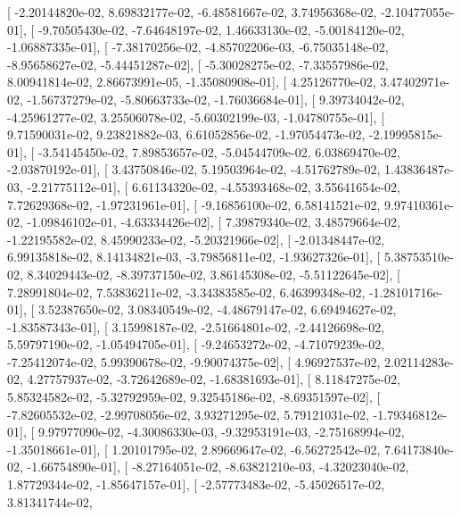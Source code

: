 \documentclass{article}
\begin{document}
       [ -2.20144820e-02,   8.69832177e-02,  -6.48581667e-02,
          3.74956368e-02,  -2.10477055e-01],
       [ -9.70505430e-02,  -7.64648197e-02,   1.46633130e-02,
         -5.00184120e-02,  -1.06887335e-01],
       [ -7.38170256e-02,  -4.85702206e-03,  -6.75035148e-02,
         -8.95658627e-02,  -5.44451287e-02],
       [ -5.30028275e-02,  -7.33557986e-02,   8.00941814e-02,
          2.86673991e-05,  -1.35080908e-01],
       [  4.25126770e-02,   3.47402971e-02,  -1.56737279e-02,
         -5.80663733e-02,  -1.76036684e-01],
       [  9.39734042e-02,  -4.25961277e-02,   3.25506078e-02,
         -5.60302199e-03,  -1.04780755e-01],
       [  9.71590031e-02,   9.23821882e-03,   6.61052856e-02,
         -1.97054473e-02,  -2.19995815e-01],
       [ -3.54145450e-02,   7.89853657e-02,  -5.04544709e-02,
          6.03869470e-02,  -2.03870192e-01],
       [  3.43750846e-02,   5.19503964e-02,  -4.51762789e-02,
          1.43836487e-03,  -2.21775112e-01],
       [  6.61134320e-02,  -4.55393468e-02,   3.55641654e-02,
          7.72629368e-02,  -1.97231961e-01],
       [ -9.16856100e-02,   6.58141521e-02,   9.97410361e-02,
         -1.09846102e-01,  -4.63334426e-02],
       [  7.39879340e-02,   3.48579664e-02,  -1.22195582e-02,
          8.45990233e-02,  -5.20321966e-02],
       [ -2.01348447e-02,   6.99135818e-02,   8.14134821e-03,
         -3.79856811e-02,  -1.93627326e-01],
       [  5.38753510e-02,   8.34029443e-02,  -8.39737150e-02,
          3.86145308e-02,  -5.51122645e-02],
       [  7.28991804e-02,   7.53836211e-02,  -3.34383585e-02,
          6.46399348e-02,  -1.28101716e-01],
       [  3.52387650e-02,   3.08340549e-02,  -4.48679147e-02,
          6.69494627e-02,  -1.83587343e-01],
       [  3.15998187e-02,  -2.51664801e-02,  -2.44126698e-02,
          5.59797190e-02,  -1.05494705e-01],
       [ -9.24653272e-02,  -4.71079239e-02,  -7.25412074e-02,
          5.99390678e-02,  -9.90074375e-02],
       [  4.96927537e-02,   2.02114283e-02,   4.27757937e-02,
         -3.72642689e-02,  -1.68381693e-01],
       [  8.11847275e-02,   5.85324582e-02,  -5.32792959e-02,
          9.32545186e-02,  -8.69351597e-02],
       [ -7.82605532e-02,  -2.99708056e-02,   3.93271295e-02,
          5.79121031e-02,  -1.79346812e-01],
       [  9.97977090e-02,  -4.30086330e-03,  -9.32953191e-03,
         -2.75168994e-02,  -1.35018661e-01],
       [  1.20101795e-02,   2.89669647e-02,  -6.56272542e-02,
          7.64173840e-02,  -1.66754890e-01],
       [ -8.27164051e-02,  -8.63821210e-03,  -4.32023040e-02,
          1.87729344e-02,  -1.85647157e-01],
       [ -2.57773483e-02,  -5.45026517e-02,   3.81341744e-02,
\end{document}
